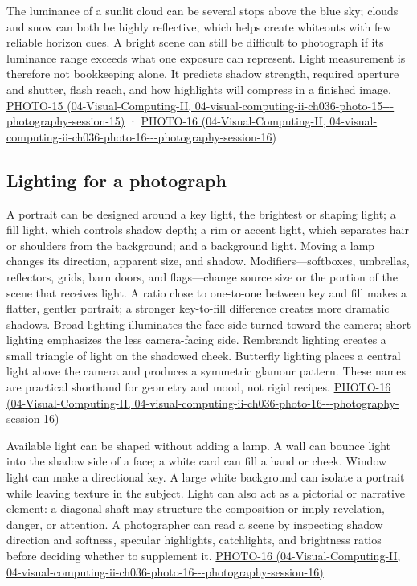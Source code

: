 The luminance of a sunlit cloud can be several stops above the blue sky; clouds and snow can both be highly reflective, which helps create whiteouts with few reliable horizon cues. A bright scene can still be difficult to photograph if its luminance range exceeds what one exposure can represent. Light measurement is therefore not bookkeeping alone. It predicts shadow strength, required aperture and shutter, flash reach, and how highlights will compress in a finished image. \href{../04-Visual-Computing-II/main.pdf\#nameddest=04-visual-computing-ii-ch036-photo-15---photography-session-15}{PHOTO-15 (04-Visual-Computing-II, 04-visual-computing-ii-ch036-photo-15-\/-\/-photography-session-15)} · \href{../04-Visual-Computing-II/main.pdf\#nameddest=04-visual-computing-ii-ch036-photo-16---photography-session-16}{PHOTO-16 (04-Visual-Computing-II, 04-visual-computing-ii-ch036-photo-16-\/-\/-photography-session-16)}

\subsection{Lighting for a photograph}\label{03-visual-computing-i-ch004-lighting-for-a-photograph}

A portrait can be designed around a key light, the brightest or shaping light; a fill light, which controls shadow depth; a rim or accent light, which separates hair or shoulders from the background; and a background light. Moving a lamp changes its direction, apparent size, and shadow. Modifiers---softboxes, umbrellas, reflectors, grids, barn doors, and flags---change source size or the portion of the scene that receives light. A ratio close to one-to-one between key and fill makes a flatter, gentler portrait; a stronger key-to-fill difference creates more dramatic shadows. Broad lighting illuminates the face side turned toward the camera; short lighting emphasizes the less camera-facing side. Rembrandt lighting creates a small triangle of light on the shadowed cheek. Butterfly lighting places a central light above the camera and produces a symmetric glamour pattern. These names are practical shorthand for geometry and mood, not rigid recipes. \href{../04-Visual-Computing-II/main.pdf\#nameddest=04-visual-computing-ii-ch036-photo-16---photography-session-16}{PHOTO-16 (04-Visual-Computing-II, 04-visual-computing-ii-ch036-photo-16-\/-\/-photography-session-16)}

Available light can be shaped without adding a lamp. A wall can bounce light into the shadow side of a face; a white card can fill a hand or cheek. Window light can make a directional key. A large white background can isolate a portrait while leaving texture in the subject. Light can also act as a pictorial or narrative element: a diagonal shaft may structure the composition or imply revelation, danger, or attention. A photographer can read a scene by inspecting shadow direction and softness, specular highlights, catchlights, and brightness ratios before deciding whether to supplement it. \href{../04-Visual-Computing-II/main.pdf\#nameddest=04-visual-computing-ii-ch036-photo-16---photography-session-16}{PHOTO-16 (04-Visual-Computing-II, 04-visual-computing-ii-ch036-photo-16-\/-\/-photography-session-16)}

